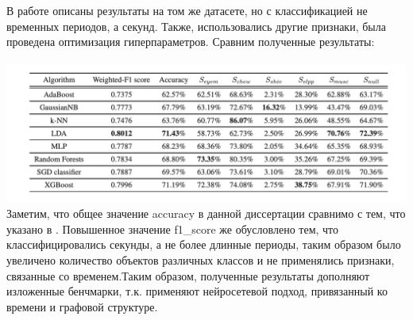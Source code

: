 \documentclass[12pt, a4paper, titlepage]{extreport}
\begin{document}
	В работе \cite{35} описаны результаты на том же датасете, но с классификацией не временных периодов, а секунд. Также, использовались другие признаки, была проведена оптимизация гиперпараметров. Сравним полученные результаты:\\
	\\
	\includegraphics[scale=0.7]{results_other}
	\\
	Заметим, что общее значение accuracy в данной диссертации сравнимо с тем, что указано в \cite{35}. Повышенное значение f1\_score же обусловлено тем, что классифицировались секунды, а не более длинные периоды, таким образом было увеличено количество объектов различных классов и не применялись признаки, связанные со временем.Таким образом, полученные результаты дополняют изложенные бенчмарки, т.к. применяют нейросетевой подход, привязанный ко времени и графовой структуре.\\
	
\end{document}
